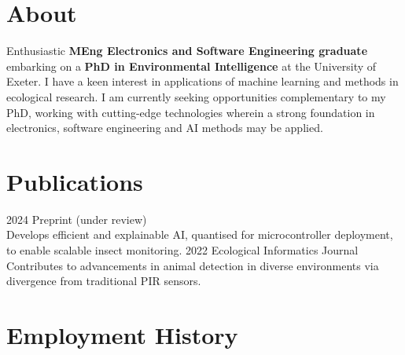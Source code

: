 \documentclass[]{cv-style}     %
\begin{document}
\section{About}
  \vspace{-0.35cm}

Enthusiastic \textbf{MEng Electronics and Software Engineering graduate} embarking on a \textbf{PhD in Environmental Intelligence} at the University of Exeter. I have a keen interest in applications of machine learning and methods in ecological research. I am currently seeking opportunities complementary to my PhD, working with cutting-edge technologies wherein a strong foundation in electronics, software engineering and AI methods may be applied.
  \vspace{-0.35cm}
\section{Publications}
  \vspace{-0.35cm}
\begin{entrylist}
\entry
{2024}
{Preprint (under review)}
{}
{ \\ Develops efficient and explainable AI, quantised for microcontroller deployment, to enable scalable insect monitoring. }
  \entry
    {2022}
    {Ecological Informatics Journal}
    {}
    {\\ Contributes to advancements in animal detection in diverse environments via divergence from traditional PIR sensors.}
    \end{entrylist}
  \vspace{-0.3cm}
\section{Employment History}
  \vspace{-0.4cm}
  
\end{document}
